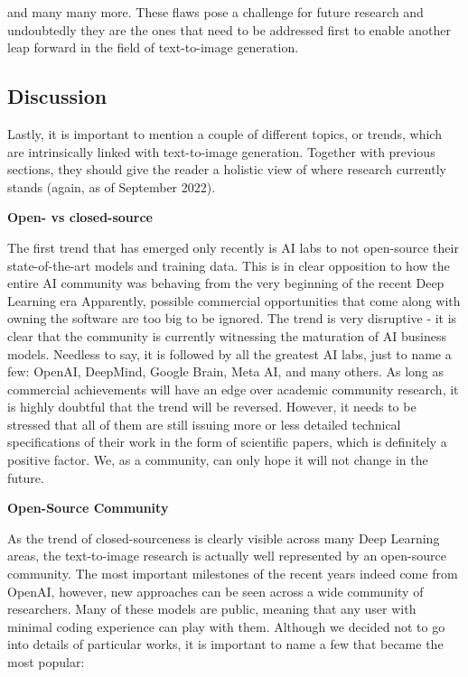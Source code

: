 \documentclass[
]{krantz}
\begin{document}
and many many more. These flaws pose a challenge for future research and undoubtedly they are the ones that need to be addressed first to enable another leap forward in the field of text-to-image generation.

\hypertarget{discussion-1}{%
\subsection{Discussion}\label{discussion-1}}

Lastly, it is important to mention a couple of different topics, or trends, which are intrinsically linked with text-to-image generation. Together with previous sections, they should give the reader a holistic view of where research currently stands (again, as of September 2022).

\textbf{Open- vs closed-source}

The first trend that has emerged only recently is AI labs to not open-source their state-of-the-art models and training data. This is in clear opposition to how the entire AI community was behaving from the very beginning of the recent Deep Learning era Apparently, possible commercial opportunities that come along with owning the software are too big to be ignored. The trend is very disruptive - it is clear that the community is currently witnessing the maturation of AI business models. Needless to say, it is followed by all the greatest AI labs, just to name a few: OpenAI, DeepMind, Google Brain, Meta AI, and many others. As long as commercial achievements will have an edge over academic community research, it is highly doubtful that the trend will be reversed. However, it needs to be stressed that all of them are still issuing more or less detailed technical specifications of their work in the form of scientific papers, which is definitely a positive factor. We, as a community, can only hope it will not change in the future.

\textbf{Open-Source Community}

As the trend of closed-sourceness is clearly visible across many Deep Learning areas, the text-to-image research is actually well represented by an open-source community. The most important milestones of the recent years indeed come from OpenAI, however, new approaches can be seen across a wide community of researchers. Many of these models are public, meaning that any user with minimal coding experience can play with them. Although we decided not to go into details of particular works, it is important to name a few that became the most popular:
\end{document}
